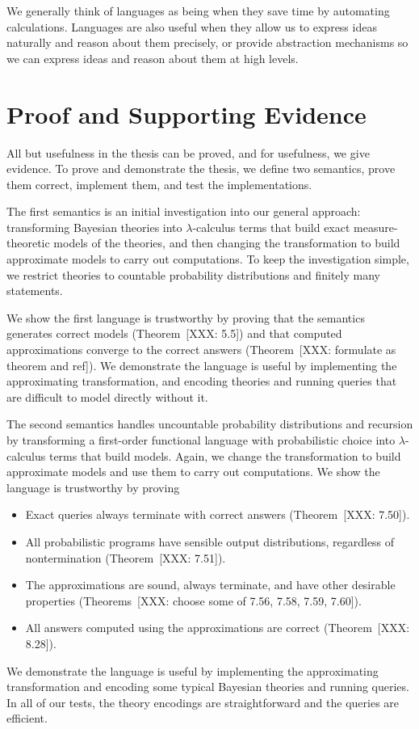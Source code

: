 We generally think of languages as being  when they save time by automating calculations.
Languages are also useful when they allow us to express ideas naturally and reason about them precisely, or provide abstraction mechanisms so we can express ideas and reason about them at high levels.

\section{Proof and Supporting Evidence}

All but usefulness in the thesis can be proved, and for usefulness, we give evidence.
To prove and demonstrate the thesis, we define two semantics, prove them correct, implement them, and test the implementations.

The first semantics is an initial investigation into our general approach: transforming Bayesian theories into $\lambda$-calculus terms that build exact measure-theoretic models of the theories, and then changing the transformation to build approximate models to carry out computations.
To keep the investigation simple, we restrict theories to countable probability distributions and finitely many statements.

We show the first language is trustworthy by proving that the semantics generates correct models (Theorem~[XXX: 5.5]) and that computed approximations converge to the correct answers (Theorem~[XXX: formulate as theorem and ref]).
We demonstrate the language is useful by implementing the approximating transformation, and encoding theories and running queries that are difficult to model directly without it.

The second semantics handles uncountable probability distributions and recursion by transforming a first-order functional language with probabilistic choice into $\lambda$-calculus terms that build models.
Again, we change the transformation to build approximate models and use them to carry out computations.
We show the language is trustworthy by proving
\begin{itemize}
	\item Exact queries always terminate with correct answers (Theorem~[XXX: 7.50]).
	\item All probabilistic programs have sensible output distributions, regardless of nontermination (Theorem~[XXX: 7.51]).
	\item The approximations are sound, always terminate, and have other desirable properties (Theorems~[XXX: choose some of 7.56, 7.58, 7.59, 7.60]).
	\item All answers computed using the approximations are correct (Theorem~[XXX: 8.28]).
\end{itemize}
We demonstrate the language is useful by implementing the approximating transformation and encoding some typical Bayesian theories and running queries.
In all of our tests, the theory encodings are straightforward and the queries are efficient.

